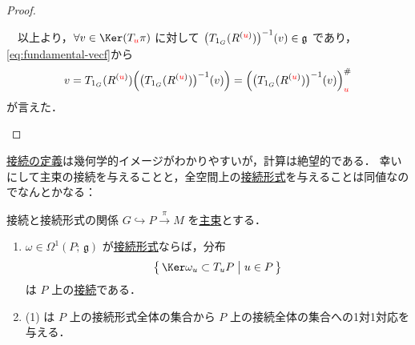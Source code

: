 \documentclass[geometry_main]{subfiles}
\begin{document}
\begin{proof}
\begin{description}
        　以上より，$\forall v \in \Ker (T_{\textcolor{red}{u}} \pi)$ に対して $\bigl(T_{1_G} (R^{(\textcolor{red}{u})})\bigr)^{-1}(v) \in \mathfrak{g}$ であり，\eqref{eq:fundamental-vecf}から
        \begin{align}
            v = T_{1_G} (R^{(\textcolor{red}{u})}) \Bigl( \bigl(T_{1_G} (R^{(\textcolor{red}{u})})\bigr)^{-1}(v)\Bigr) = \Bigl(\bigl(T_{1_G} (R^{(\textcolor{red}{u})})\bigr)^{-1}(v)\Bigr)^\#_{\textcolor{red}{u}}
        \end{align}
        が言えた．
    \end{description}

\end{proof}

\hyperref[def:connection]{接続の定義}は幾何学的イメージがわかりやすいが，計算は絶望的である．
幸いにして主束の接続を与えることと，全空間上の\hyperref[def:connection]{接続形式}を与えることは同値なのでなんとかなる：

\begin{mytheo}[label=thm:connection-basic]{接続と接続形式の関係}
    $G \hookrightarrow P \xrightarrow{\pi} M$ を\hyperref[def.PFD]{主束}とする．
    \begin{enumerate}
        \item $\omega \in \Omega^1(P;\, \mathfrak{g})$ が\hyperref[def:connection]{接続形式}ならば，分布 
        \begin{align}
            \bigl\{\, \Ker \omega_u \subset T_u P\bigm| u \in P \,\bigr\} 
        \end{align}
        は $P$ 上の\hyperref[def:connection]{接続}である．
        \item (1) は $P$ 上の接続形式全体の集合から $P$ 上の接続全体の集合への1対1対応を与える．
    \end{enumerate}
\end{mytheo}
\end{document}

